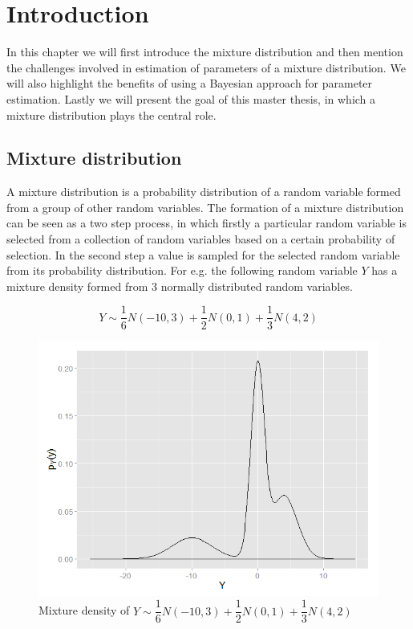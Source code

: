
\chapter{Introduction}
\label{ch : introduction}

In this chapter we will first introduce the mixture distribution and then mention the challenges involved in estimation of parameters of a mixture distribution. We will also highlight the benefits of using a Bayesian approach for parameter estimation. Lastly we will present the goal of this master thesis, in which a mixture distribution plays the central role.

\section{Mixture distribution}
\label{sec : mixture_distribution}
A mixture distribution is a probability distribution of a random variable formed from a group of other random variables. The formation of a mixture distribution can be seen as a two step process, in which firstly a particular random variable is selected from a collection of random variables based on a certain probability of selection. In the second step a value is sampled for the selected random variable from its probability distribution. For e.g. the following random variable $Y$ has a mixture density formed from 3 normally distributed random variables.

$$Y \sim \dfrac{1}{6}N(-10,3) + \dfrac{1}{2}N(0,1) + \dfrac{1}{3}N(4,2)$$

\begin{figure}
	\centering
	\includegraphics[scale=0.5]{mainmatter/chapter_1_introduction/mixture_density.png}
	\caption{Mixture density of $Y \sim \dfrac{1}{6}N(-10,3) + \dfrac{1}{2}N(0,1) + \dfrac{1}{3}N(4,2)$}
	\label{fig : mixture_density_1}
\end{figure}


